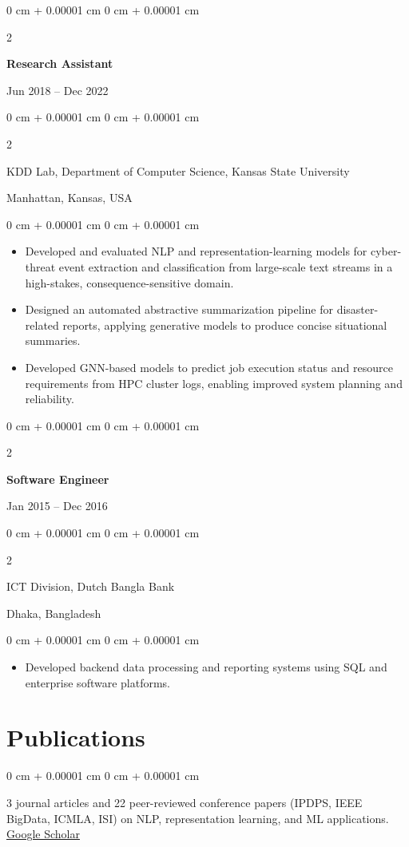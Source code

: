 \documentclass[10pt, letterpaper]{article}
\newenvironment{highlights}{
    \begin{itemize}[
        topsep=0.10 cm,
        parsep=0.10 cm,
        partopsep=0pt,
        itemsep=0pt,
        leftmargin=0 cm + 10pt
    ]
}{
    \end{itemize}
} %
\newenvironment{onecolentry}{
    \begin{adjustwidth}{
        0 cm + 0.00001 cm
    }{
        0 cm + 0.00001 cm
    }
}{
    \end{adjustwidth}
} %
\newenvironment{twocolentry}[2][]{
    \onecolentry
    \def\secondColumn{#2}
    \setcolumnwidth{\fill, 4.5 cm}
    \begin{paracol}{2}
}{
    \switchcolumn \raggedleft \secondColumn
    \end{paracol}
    \endonecolentry
} %
\let\hrefWithoutArrow\href
\begin{document}
    \vspace{1mm}
    
    \begin{twocolentry}{Jun 2018 -- Dec 2022}
        \textbf{Research Assistant}
    \end{twocolentry}
    \begin{twocolentry}{Manhattan, Kansas, USA}
       KDD Lab, Department of Computer Science, Kansas State University
    \end{twocolentry}
    \vspace{0.10 cm}
    \begin{onecolentry}
        \begin{highlights}
            \item Developed and evaluated NLP and representation-learning models for cyber-threat event extraction and classification from large-scale text streams in a high-stakes, consequence-sensitive domain.
            \item Designed an automated abstractive summarization pipeline for disaster-related reports, applying generative models to produce concise situational summaries.
            \item Developed GNN-based models to predict job execution status and resource requirements from HPC cluster logs, enabling improved system planning and reliability.
        \end{highlights}
    \end{onecolentry}

    \vspace{0.1 cm}
    \begin{twocolentry}{Jan 2015 -- Dec 2016}
        \textbf{Software Engineer}
    \end{twocolentry}
    \begin{twocolentry}{Dhaka, Bangladesh}
       ICT Division, Dutch Bangla Bank
    \end{twocolentry}
    
    \begin{onecolentry}
        \begin{highlights}
            \item Developed backend data processing and reporting systems using SQL and enterprise software platforms.
        \end{highlights}
    \end{onecolentry}
    
    \vspace{-1mm}
    \section{Publications}
        \begin{onecolentry}
            3 journal articles and 22 peer-reviewed conference papers (IPDPS, IEEE BigData, ICMLA, ISI) on NLP, representation learning, and ML applications. \hrefWithoutArrow{https://scholar.google.com/citations?user=y5ndUuMAAAAJ\&hl=en\&oi=ao}{Google Scholar}
        \end{onecolentry}
\end{document}
